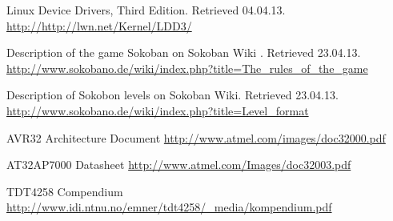 \documentclass[a4paper,11pt]{article}
\begin{document}
\footnotesize{  %
\begin{thebibliography}{N}
 Linux Device Drivers, Third Edition. Retrieved 04.04.13.
\url{http://http://lwn.net/Kernel/LDD3/}

 Description of the game Sokoban on Sokoban Wiki . Retrieved 23.04.13.
\url{http://www.sokobano.de/wiki/index.php?title=The_rules_of_the_game}

 Description of Sokobon levels on Sokoban Wiki. Retrieved 23.04.13.
\url{http://www.sokobano.de/wiki/index.php?title=Level_format}

 AVR32 Architecture Document
\url{http://www.atmel.com/images/doc32000.pdf}

 AT32AP7000 Datasheet
\url{http://www.atmel.com/Images/doc32003.pdf}

 TDT4258 Compendium
\url{http://www.idi.ntnu.no/emner/tdt4258/_media/kompendium.pdf}

\end{thebibliography}  
}
\end{document}
